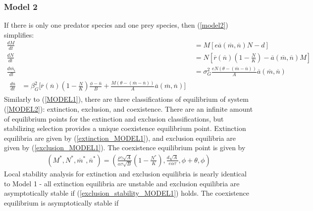 \documentclass{amsart}
\theoremstyle{definition}
\theoremstyle{remark}
\numberwithin{equation}{section}
\begin{document}
\subsubsection{Model 2}
If there is only one predator species and one prey species, then (\ref{model2}) simplifies:
\begin{subequations}
	\label{MODEL2}
	\begin{align}
		\label{eq:MODEL2_A}
		\frac{dM}{dt} &= M\left[e\overline{a}(\overline{m}, \overline{n})N - d\right] \\[5px]
		\label{eq:MODEL2_B}
		\frac{dN}{dt} &= N\left[\overline{r}(\overline{n})\left(1 - \frac{N}{K}\right) - \overline{a}(\overline{m}, \overline{n})M\right] \\[5px]
		\label{eq:MODEL2_C}
		\frac{d\overline{m_i}}{dt} &= \sigma_{G}^2\frac{eN(\theta - (\overline{m} - \overline{n}))}{A}\overline{a}(\overline{m}, \overline{n}) \\[5px]
		\label{eq:MODEL2_D}
		\begin{split}
			\frac{d\overline{n}}{dt} &= \beta_{G}^2\Bigg[\overline{r}(\overline{n})\left(1 - \frac{N}{K}\right)\frac{\phi - \overline{n}}{B} + \frac{M(\theta - (\overline{m} - \overline{n}))}{A}\overline{a}(\overline{m}, \overline{n})\Bigg]
		\end{split}
	\end{align}
\end{subequations}
Similarly to (\ref{MODEL1}), there are three classifications of equilibrium of system (\ref{MODEL2}): extinction, exclusion, and coexistence.  There are an infinite amount of equilibrium points for the extinction and exclusion classifications, but stabilizing selection provides a unique coexistence equilibrium point.  Extinction equilibria are given by (\ref{extinction_MODEL1}), and exclusion equilibria are given by (\ref{exclusion_MODEL1}).  The coexistence equilibrium point is given by
\begin{equation}
	\label{coexistence_MODEL2}
	\begin{aligned}
		(M^*, N^*, \overline{m}^*, \overline{n}^*) = \left(\frac{\rho\gamma\sqrt{A}}{\alpha\tau\sqrt{B}}\left(1 - \frac{N^*}{K}\right), \frac{d\sqrt{A}}{e\alpha\tau}, \phi + \theta, \phi\right)
	\end{aligned}
\end{equation}
Local stability analysis for extinction and exclusion equilibria is nearly identical to Model 1 - all extinction equilibria are unstable and exclusion equilibria are asymptotically stable if (\ref{exclusion_stability_MODEL1}) holds.  The coexistence equilibrium is asymptotically stable if
\end{document}
